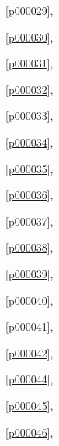 \noindent\figurename\ \ref{p000029},\ \pageref{p000029}

\noindent\figurename\ \ref{p000030},\ \pageref{p000030}

\noindent\figurename\ \ref{p000031},\ \pageref{p000031}

\noindent\figurename\ \ref{p000032},\ \pageref{p000032}

\noindent\figurename\ \ref{p000033},\ \pageref{p000033}

\noindent\figurename\ \ref{p000034},\ \pageref{p000034}

\noindent\figurename\ \ref{p000035},\ \pageref{p000035}

\noindent\figurename\ \ref{p000036},\ \pageref{p000036}

\noindent\figurename\ \ref{p000037},\ \pageref{p000037}

\noindent\figurename\ \ref{p000038},\ \pageref{p000038}

\noindent\figurename\ \ref{p000039},\ \pageref{p000039}

\noindent\figurename\ \ref{p000040},\ \pageref{p000040}

\noindent\figurename\ \ref{p000041},\ \pageref{p000041}

\noindent\figurename\ \ref{p000042},\ \pageref{p000042}

\noindent\figurename\ \ref{p000044},\ \pageref{p000044}

\noindent\figurename\ \ref{p000045},\ \pageref{p000045}

\noindent\figurename\ \ref{p000046},\ \pageref{p000046}









